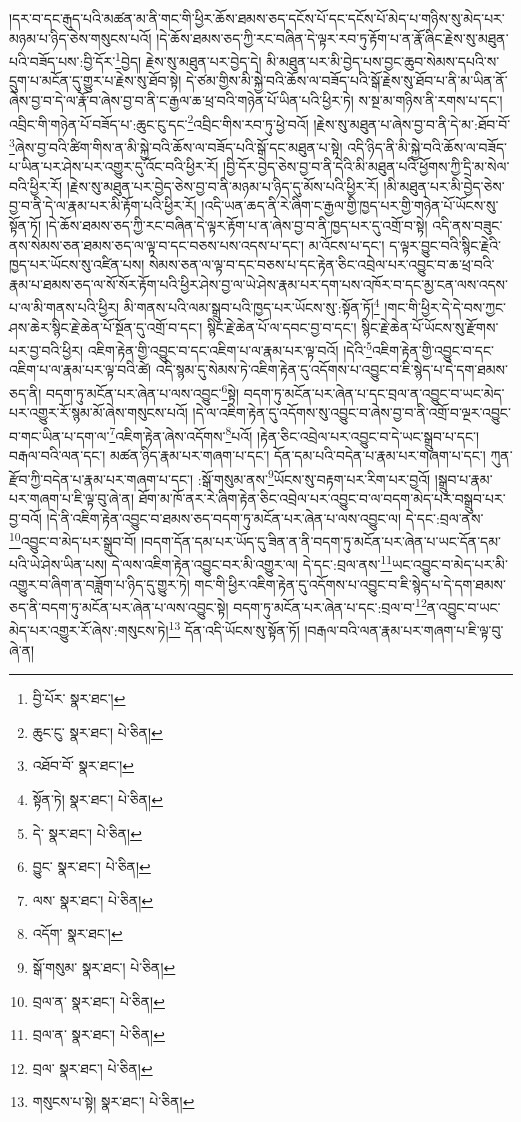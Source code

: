 །དར་བ་དང་རྒུད་པའི་མཚན་མ་ནི་གང་གི་ཕྱིར་ཆོས་ཐམས་ཅད་དངོས་པོ་དང་དངོས་པོ་མེད་པ་གཉིས་སུ་མེད་པར་མཉམ་པ་ཉིད་ཅེས་གསུངས་པའོ། །དེ་ཆོས་ཐམས་ཅད་ཀྱི་རང་བཞིན་དེ་ལྟར་རབ་ཏུ་རྟོག་པ་ན་རྣོ་ཞིང་རྗེས་སུ་མཐུན་པའི་བཟོད་པས་:བྱི་དོར་\footnote{བྱི་པོར་  སྣར་ཐང་། }བྱེད། རྗེས་སུ་མཐུན་པར་བྱེད་དེ། མི་མཐུན་པར་མི་བྱེད་པས་བྱང་ཆུབ་སེམས་དཔའི་ས་དྲུག་པ་མངོན་དུ་གྱུར་པ་རྗེས་སུ་ཐོབ་སྟེ། དེ་ཙམ་གྱིས་མི་སྐྱེ་བའི་ཆོས་ལ་བཟོད་པའི་སྒོ་རྗེས་སུ་ཐོབ་པ་ནི་མ་ཡིན་ནོ་ཞེས་བྱ་བ་དེ་ལ་རྣོ་བ་ཞེས་བྱ་བ་ནི་ང་རྒྱལ་ཆ་ཕྲ་བའི་གཉེན་པོ་ཡིན་པའི་ཕྱིར་ཏེ། ས་སྔ་མ་གཉིས་ནི་རགས་པ་དང་། འབྲིང་གི་གཉེན་པོ་བཟོད་པ་:ཆུང་ངུ་དང་\footnote{ཆུང་ངུ་  སྣར་ཐང་།  པེ་ཅིན། }འབྲིང་གིས་རབ་ཏུ་ཕྱེ་བའོ། །རྗེས་སུ་མཐུན་པ་ཞེས་བྱ་བ་ནི་དེ་མ་:ཐོབ་བོ་\footnote{འཐོབ་བོ་  སྣར་ཐང་། }ཞེས་བྱ་བའི་ཚིག་གིས་ན་མི་སྐྱེ་བའི་ཆོས་ལ་བཟོད་པའི་སྒོ་དང་མཐུན་པ་སྟེ། འདི་ཉིད་ནི་མི་སྐྱེ་བའི་ཆོས་ལ་བཟོད་པ་ཡིན་པར་ཤེས་པར་འགྱུར་དུ་འོང་བའི་ཕྱིར་རོ། །བྱི་དོར་བྱེད་ཅེས་བྱ་བ་ནི་དེའི་མི་མཐུན་པའི་ཕྱོགས་ཀྱི་དྲི་མ་སེལ་བའི་ཕྱིར་རོ། །རྗེས་སུ་མཐུན་པར་བྱེད་ཅེས་བྱ་བ་ནི་མཉམ་པ་ཉིད་དུ་མོས་པའི་ཕྱིར་རོ། །མི་མཐུན་པར་མི་བྱེད་ཅེས་བྱ་བ་ནི་དེ་ལ་རྣམ་པར་མི་རྟོག་པའི་ཕྱིར་རོ། །འདི་ཡན་ཆད་ནི་རེ་ཞིག་ང་རྒྱལ་གྱི་ཁྱད་པར་གྱི་གཉེན་པོ་ཡོངས་སུ་སྟོན་ཏོ། །དེ་ཆོས་ཐམས་ཅད་ཀྱི་རང་བཞིན་དེ་ལྟར་རྟོག་པ་ན་ཞེས་བྱ་བ་ནི་ཁྱད་པར་དུ་འགྲོ་བ་སྟེ། འདི་ནས་བཟུང་ནས་སེམས་ཅན་ཐམས་ཅད་ལ་ལྟ་བ་དང་བཅས་པས་འདས་པ་དང་། མ་འོངས་པ་དང་། ད་ལྟར་བྱུང་བའི་སྙིང་རྗེའི་ཁྱད་པར་ཡོངས་སུ་འཛིན་པས། སེམས་ཅན་ལ་ལྟ་བ་དང་བཅས་པ་དང་རྟེན་ཅིང་འབྲེལ་པར་འབྱུང་བ་ཆ་ཕྲ་བའི་རྣམ་པ་ཐམས་ཅད་ལ་སོ་སོར་རྟོག་པའི་ཕྱིར་ཤེས་བྱ་ལ་ཡེ་ཤེས་རྣམ་པར་དག་པས་འཁོར་བ་དང་མྱ་ངན་ལས་འདས་པ་ལ་མི་གནས་པའི་ཕྱིར། མི་གནས་པའི་ལམ་སྒྲུབ་པའི་ཁྱད་པར་ཡོངས་སུ་:སྟོན་ཏོ།\footnote{སྟོན་ཏེ།  སྣར་ཐང་།  པེ་ཅིན། } །གང་གི་ཕྱིར་དེ་དེ་བས་ཀྱང་ཤས་ཆེར་སྙིང་རྗེ་ཆེན་པོ་སྔོན་དུ་འགྲོ་བ་དང་། སྙིང་རྗེ་ཆེན་པོ་ལ་དབང་བྱ་བ་དང་། སྙིང་རྗེ་ཆེན་པོ་ཡོངས་སུ་རྫོགས་པར་བྱ་བའི་ཕྱིར། འཇིག་རྟེན་གྱི་འབྱུང་བ་དང་འཇིག་པ་ལ་རྣམ་པར་ལྟ་བའོ། །དེའི་\footnote{དེ་  སྣར་ཐང་།  པེ་ཅིན། }འཇིག་རྟེན་གྱི་འབྱུང་བ་དང་འཇིག་པ་ལ་རྣམ་པར་ལྟ་བའི་ཚེ། འདི་སྙམ་དུ་སེམས་ཏེ་འཇིག་རྟེན་དུ་འདོགས་པ་འབྱུང་བ་ཇི་སྙེད་པ་དེ་དག་ཐམས་ཅད་ནི། བདག་ཏུ་མངོན་པར་ཞེན་པ་ལས་འབྱུང་\footnote{བྱུང་  སྣར་ཐང་།  པེ་ཅིན། }སྟེ། བདག་ཏུ་མངོན་པར་ཞེན་པ་དང་བྲལ་ན་འབྱུང་བ་ཡང་མེད་པར་འགྱུར་རོ་སྙམ་མོ་ཞེས་གསུངས་པའོ། །དེ་ལ་འཇིག་རྟེན་དུ་འདོགས་སུ་འབྱུང་བ་ཞེས་བྱ་བ་ནི་འགྲོ་བ་ལྔར་འབྱུང་བ་གང་ཡིན་པ་དག་ལ་\footnote{ལས་  སྣར་ཐང་།  པེ་ཅིན། }འཇིག་རྟེན་ཞེས་འདོགས་\footnote{འདོག་  སྣར་ཐང་། }པའོ། །རྟེན་ཅིང་འབྲེལ་པར་འབྱུང་བ་དེ་ཡང་སྒྲུབ་པ་དང་། བརྒལ་བའི་ལན་དང་། མཚན་ཉིད་རྣམ་པར་གཞག་པ་དང་། དོན་དམ་པའི་བདེན་པ་རྣམ་པར་གཞག་པ་དང་། ཀུན་རྫོབ་ཀྱི་བདེན་པ་རྣམ་པར་གཞག་པ་དང་། :སྒོ་གསུམ་ནས་\footnote{སྒོ་གསུམ་  སྣར་ཐང་།  པེ་ཅིན། }ཡོངས་སུ་བརྟག་པར་རིག་པར་བྱའོ། །སྒྲུབ་པ་རྣམ་པར་གཞག་པ་ཇི་ལྟ་བུ་ཞེ་ན། ཐོག་མ་ཁོ་ནར་རེ་ཞིག་རྟེན་ཅིང་འབྲེལ་པར་འབྱུང་བ་ལ་བདག་མེད་པར་བསྒྲུབ་པར་བྱ་བའོ། །དེ་ནི་འཇིག་རྟེན་འབྱུང་བ་ཐམས་ཅད་བདག་ཏུ་མངོན་པར་ཞེན་པ་ལས་འབྱུང་ལ། དེ་དང་:བྲལ་ནས་\footnote{བྲལ་ན་  སྣར་ཐང་།  པེ་ཅིན། }འབྱུང་བ་མེད་པར་སྒྲུབ་བོ། །བདག་དོན་དམ་པར་ཡོད་དུ་ཟིན་ན་ནི་བདག་ཏུ་མངོན་པར་ཞེན་པ་ཡང་དོན་དམ་པའི་ཡེ་ཤེས་ཡིན་པས། དེ་ལས་འཇིག་རྟེན་འབྱུང་བར་མི་འགྱུར་ལ། དེ་དང་:བྲལ་ནས་\footnote{བྲལ་ན་  སྣར་ཐང་།  པེ་ཅིན། }ཡང་འབྱུང་བ་མེད་པར་མི་འགྱུར་བ་ཞིག་ན་བཟློག་པ་ཉིད་དུ་གྱུར་ཏེ། གང་གི་ཕྱིར་འཇིག་རྟེན་དུ་འདོགས་པ་འབྱུང་བ་ཇི་སྙེད་པ་དེ་དག་ཐམས་ཅད་ནི་བདག་ཏུ་མངོན་པར་ཞེན་པ་ལས་འབྱུང་སྟེ། བདག་ཏུ་མངོན་པར་ཞེན་པ་དང་:བྲལ་བ་\footnote{བྲལ་  སྣར་ཐང་།  པེ་ཅིན། }ན་འབྱུང་བ་ཡང་མེད་པར་འགྱུར་རོ་ཞེས་:གསུངས་ཏེ།\footnote{གསུངས་པ་སྟེ།  སྣར་ཐང་།  པེ་ཅིན། } དོན་འདི་ཡོངས་སུ་སྟོན་ཏོ། །བརྒལ་བའི་ལན་རྣམ་པར་གཞག་པ་ཇི་ལྟ་བུ་ཞེ་ན། 
